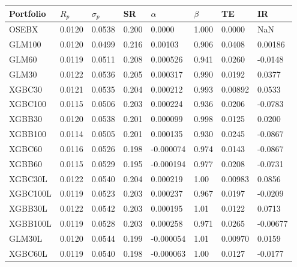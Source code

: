 \begin{table}[H]
\centering
\begin{tabularx}{\textwidth}{Xlllllll}
\toprule
Portfolio & $R_p$ & $\sigma_p$ & SR & $\alpha$ & $\beta$ & TE & IR \\
\midrule
OSEBX & 0.0120 & 0.0538 & 0.200 & 0.0000 & 1.000 & 0.0000 & NaN \\
\midrule
GLM100 & 0.0120 & \cellcolor{lightlightgreen}0.0499 & \cellcolor{lightlightgreen}0.216 & \cellcolor{lightlightgreen}0.00103 & 0.906 & 0.0408 & 0.00186 \\
GLM60 & 0.0119 & 0.0511 & 0.208 & 0.000526 & 0.941 & 0.0260 & -0.0148 \\
GLM30 & \cellcolor{lightlightgreen}0.0122 & 0.0536 & 0.205 & 0.000317 & 0.990 & \cellcolor{lightlightgreen}0.0192 & 0.0377 \\
XGBC30 & 0.0121 & 0.0535 & 0.204 & 0.000212 & 0.993 & \cellcolor{lightlightgreen}0.00892 & \cellcolor{lightlightgreen}0.0533 \\
XGBC100 & 0.0115 & 0.0506 & 0.203 & 0.000224 & 0.936 & 0.0206 & -0.0783 \\
XGBB30 & 0.0120 & 0.0538 & 0.201 & 0.000099 & 0.998 & \cellcolor{lightlightgreen}0.0125 & 0.0200 \\
XGBB100 & 0.0114 & 0.0505 & 0.201 & 0.000135 & 0.930 & 0.0245 & -0.0867 \\
XGBC60 & 0.0116 & 0.0526 & 0.198 & -0.000074 & 0.974 & \cellcolor{lightlightgreen}0.0143 & -0.0867 \\
XGBB60 & 0.0115 & 0.0529 & 0.195 & -0.000194 & 0.977 & 0.0208 & -0.0731 \\
\midrule
XGBC30L & \cellcolor{lightlightgreen}0.0122 & 0.0540 & \cellcolor{lightlightgreen}0.204 & 0.000219 & 1.00 & \cellcolor{lightlightgreen}0.00983 & \cellcolor{lightlightgreen}0.0856 \\
XGBC100L & 0.0119 & \cellcolor{lightlightgreen}0.0523 & 0.203 & 0.000237 & 0.967 & \cellcolor{lightlightgreen}0.0197 & -0.0209 \\
XGBB30L & \cellcolor{lightlightgreen}0.0122 & 0.0542 & 0.203 & 0.000195 & 1.01 & \cellcolor{lightlightgreen}0.0122 & 0.0713 \\
XGBB100L & 0.0119 & 0.0528 & 0.203 & \cellcolor{lightlightgreen}0.000258 & 0.971 & 0.0265 & -0.00677 \\
GLM30L & 0.0120 & 0.0544 & 0.199 & -0.000054 & 1.01 & \cellcolor{lightlightgreen}0.00970 & 0.0159 \\
XGBC60L & 0.0119 & 0.0540 & 0.198 & -0.000063 & 1.00 & \cellcolor{lightlightgreen}0.0127 & -0.0177 \\

\end{tabularx}
\end{table}
